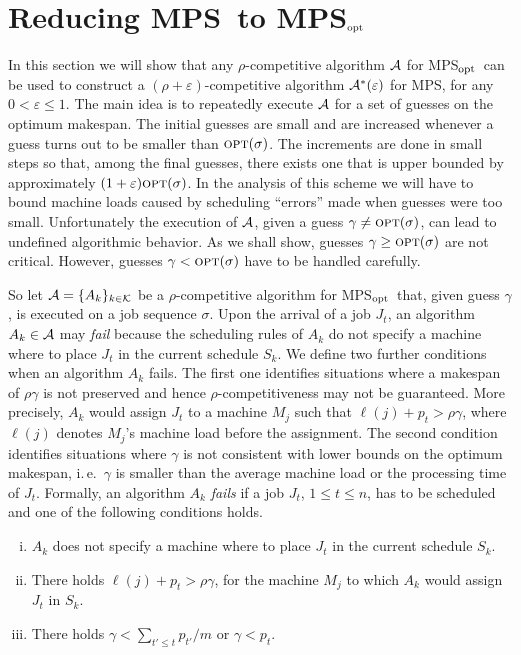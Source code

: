 \documentclass{llncs}
\newcommand{\OPT}{\text{{\sc opt}}}
\newcommand{\opt}{\OPT}
\newcommand{\MPS}{{\rm MPS}}
\newcommand{\MPSO}{{\rm MPS$_{\rm opt}$}}
\newcommand{\eps}{\varepsilon}
\begin{document}
\section{Reducing \MPS\ to \MPSO}\label{sec:redu}

In this section we will show that any $\rho$-competitive algorithm ${\cal A}$ for \MPSO\ can 
be used to construct a $(\rho+\eps)$-competitive algorithm ${\cal A^*}(\eps)$ for \MPS, for any $0<\eps \leq 1$. 
The main idea is to repeatedly execute ${\cal A}$ for a set of guesses on the optimum makespan.
The initial guesses are small and are increased whenever a guess turns out to be smaller than $\opt(\sigma)$. 
The increments are done in small steps so that, among the final guesses, there exists one that is upper bounded
by approximately $(1+\eps)\opt(\sigma)$. In the analysis of this scheme we will have to bound machine
loads caused by scheduling ``errors'' made when guesses were too small.
Unfortunately the execution of ${\cal A}$, given a guess $\gamma \neq \opt(\sigma)$, can lead to undefined
algorithmic behavior. As we shall show,
guesses $\gamma \geq \opt(\sigma)$ are not critical. However, guesses $\gamma < \opt(\sigma)$ have to be handled 
carefully. 

So let ${\cal A} = \{A_k\}_{k\in {\cal K}}$ be a $\rho$-competitive algorithm for \MPSO\ that, given guess 
$\gamma$, is executed on a job sequence $\sigma$. Upon the arrival of a job $J_t$, an algorithm
$A_k\in {\cal A}$ may {\em fail\/}  because the scheduling rules of $A_k$ do not specify a machine where 
to place $J_t$ in the current schedule $S_k$. We define two further conditions when an algorithm $A_k$
fails. The first one identifies situations where a makespan of $\rho\gamma$ is not preserved and hence
$\rho$-competitiveness may not be guaranteed. More precisely, $A_k$ would assign $J_t$ to a machine $M_j$ such 
that $\ell(j) + p_t > \rho\gamma$, where $\ell(j)$ denotes $M_j$'s machine load before the assignment.
The second condition identifies situations where $\gamma$ is not consistent with lower bounds on the
optimum makespan, i.\,e.\ $\gamma$ is smaller than the average machine load or the processing time
of $J_t$. Formally, an algorithm $A_k$ {\em fails\/} if a job $J_t$, $1\leq t \leq n$, has to be
scheduled and one of the following conditions holds.
\begin{enumerate}[(i)] 
 \item $A_k$ does not specify a machine where to place $J_t$ in the current schedule $S_k$.
 \item There holds $\ell(j)+p_t > \rho \gamma$, for the machine $M_j$ to which $A_k$ would assign $J_t$ 
      in $S_k$.
 \item There holds $\gamma < \sum_{t'\leq t} p_{t'}/m$ or $\gamma < p_t$.
\end{enumerate}
\end{document}
